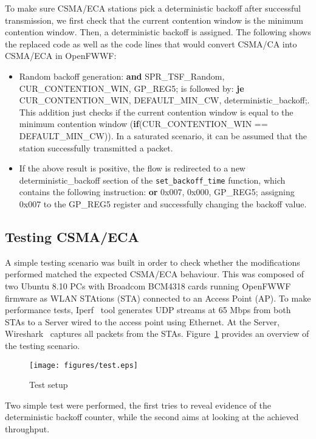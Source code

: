 \documentclass[conference]{IEEEtran}
\begin{document}
To make sure CSMA/ECA stations pick a deterministic backoff after successful transmission, we first check that the current contention window is the minimum contention window. Then, a deterministic backoff is assigned. The following shows the replaced code as well as the code lines that would convert CSMA/CA into CSMA/ECA in OpenFWWF:

\begin{itemize}
	\item Random backoff generation: {\bf and} SPR\_TSF\_Random, CUR\_CONTENTION\_WIN, GP\_REG5; is followed by: {\bf je} CUR\_CONTENTION\_WIN, DEFAULT\_MIN\_CW, deterministic\_backoff;. \\
	This addition just checks if the current contention window is equal to the minimum contention window ({\bf if}(CUR\_CONTENTION\_WIN == DEFAULT\_MIN\_CW)). In a saturated scenario, it can be assumed that the station successfully transmitted a packet.
	\item If the above result is positive, the flow is redirected to a new deterministic\_backoff section of the \texttt{set\_backoff\_time} function, which contains the following instruction: {\bf or} 0x007, 0x000, GP\_REG5; assigning 0x007 to the GP\_REG5 register and successfully changing the backoff value.
\end{itemize}

\subsection{Testing CSMA/ECA}
A simple testing scenario was built in order to check whether the modifications performed matched the expected CSMA/ECA behaviour. This was composed of two Ubuntu 8.10 PCs with Broadcom BCM4318 cards running OpenFWWF firmware as WLAN STAtions (STA) connected to an Access Point (AP). To make performance tests, Iperf~\cite{tirumala2005iperf} tool generates UDP streams at 65 Mbps from both STAs to a Server wired to the access point using Ethernet. At the Server, Wireshark~\cite{combs2007wireshark} captures all packets from the STAs. Figure~\ref{setup} provides an overview of the testing scenario.

\begin{figure}[htbp]
\centering
  \texttt{[image: figures/test.eps]}
  \caption{Test setup}
  \label{setup}
\end{figure}

Two simple test were performed, the first tries to reveal evidence of the deterministic backoff counter, while the second aims at looking at the achieved throughput. 
\end{document}
